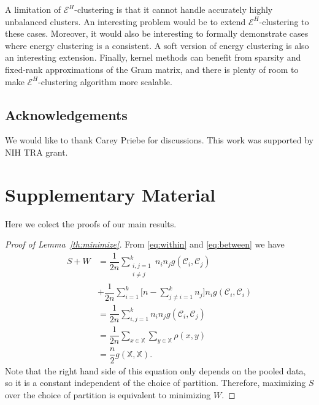 \documentclass[twoside]{article}
\newcommand\C{{\mathcal{C}}}
\begin{document}
A limitation of $\mathcal{E}^H$-clustering  is that it cannot
handle accurately highly unbalanced clusters. 
An interesting problem would be to
extend $\mathcal{E}^H$-clustering to these cases.
Moreover, it would also be interesting to formally 
demonstrate cases where energy clustering is a 
consistent. A soft version of energy clustering is also an
interesting extension.
Finally, kernel methods can benefit from sparsity and
fixed-rank approximations of the Gram matrix, and there is plenty
of room to make $\mathcal{E}^H$-clustering algorithm more scalable.


\subsection*{Acknowledgements}
We would like to thank Carey Priebe for discussions.
This work was supported by NIH TRA grant.


%
%



\clearpage

\appendix

\section{Supplementary Material}

Here we colect the proofs of our main results.

\begin{proof}[Proof of Lemma~\ref{th:minimize}]
From \eqref{eq:within} and \eqref{eq:between}
we have
\begin{equation}
\begin{split}
S + W &= 
\dfrac{1}{2n} \sum_{\substack{i,j=1 \\ i\ne j}}^k n_i n_j g(\C_i, \C_j)
\\&+ \dfrac{1}{2n} \sum_{i=1}^{k} 
\bigg[ n - 
\sum_{j\ne i = 1}^k n_j \bigg] 
n_i g(\C_i, \C_i) \\
& = \dfrac{1}{2n} \sum_{i,j=1}^k n_i n_j g(\C_i, \C_j) \\
&= \dfrac{1}{2n} \sum_{x \in \mathbb{X}} \sum_{y \in \mathbb{X}} \rho(x,y)\\
&= \dfrac{n}{2} g(\mathbb{X}, \mathbb{X}).
\end{split}
\end{equation}
Note that the right hand side of this equation 
only depends on the pooled data, so it is a constant
independent of the choice of partition. Therefore, maximizing
$S$ over the choice of partition is equivalent to minimizing $W$.
\end{proof}
\end{document}
